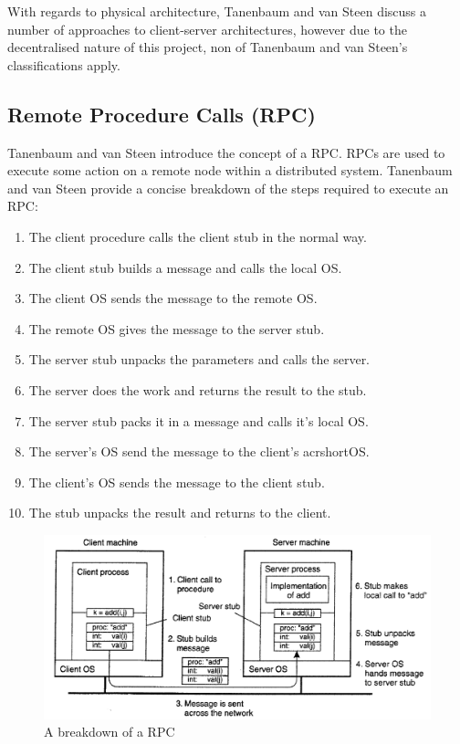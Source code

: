 \documentclass[a4paper, 11pt]{report}
\begin{document}
With regards to physical architecture, Tanenbaum and van Steen discuss a number of approaches to client-server architectures, however due to the decentralised nature of this project, non of Tanenbaum and van Steen's classifications apply. 

\subsection{Remote Procedure Calls (RPC)}
Tanenbaum and van Steen introduce the concept of a \acrfull{RPC}. \acrshort{RPC}s are used to execute some action on a remote node within a distributed system.  Tanenbaum and van Steen provide a concise breakdown of the steps required to execute an \acrshort{RPC}:

\begin{enumerate}
    \item The client procedure calls the client \gls{stub} in the normal way.
    \item The client \gls{stub} builds a message and calls the local \acrfull{OS}.
    \item The client \acrshort{OS} sends the message to the remote \acrshort{OS}.
    \item The remote \acrshort{OS} gives the message to the server \gls{stub}.
    \item The server \gls{stub} unpacks the parameters and calls the server.
    \item The server does the work and returns the result to the \gls{stub}.
    \item The server \gls{stub} packs it in a message and calls it's local \acrshort{OS}.
    \item The server's \acrshort{OS} send the message to the client's acrshort{OS}.
    \item The client's \acrshort{OS} sends the message to the client \gls{stub}.
    \item The \gls{stub} unpacks the result and returns to the client.
\end{enumerate}

\begin{figure}[H]
\centering
\includegraphics[width=\textwidth,keepaspectratio]{rpc}
\caption{A breakdown of a \acrshort{RPC} \cite{tanenbaumdist}} 
\label{fig:rpc}
\end{figure}
\end{document}
